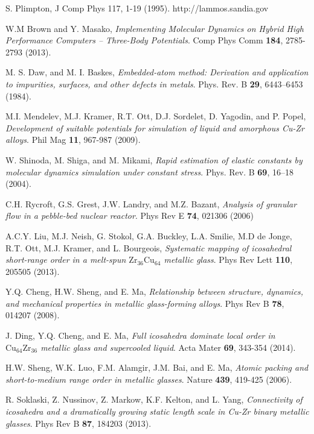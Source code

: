 \documentclass[aps,prl,preprint,showpacs,amsmath,floatfix,superscriptaddress]{revtex4}
\begin{document}
\begin{thebibliography}{}
S. Plimpton, J Comp Phys 117, 1-19 (1995). http://lammos.sandia.gov

W.M Brown and Y. Masako, \textit{Implementing Molecular Dynamics on Hybrid High Performance Computers – Three-Body Potentials}. Comp Phys Comm \textbf{184}, 2785-2793 (2013).

M. S. Daw, and M. I. Baskes, \textit{Embedded-atom method: Derivation and application to impurities, surfaces, and other defects in metals}. Phys. Rev. B \textbf{29}, 6443–6453 (1984).

M.I. Mendelev, M.J. Kramer, R.T. Ott, D.J. Sordelet, D. Yagodin, and P. Popel, \textit{Development of suitable potentials for simulation of liquid and amorphous Cu-Zr alloys}. Phil Mag \textbf{11}, 967-987 (2009).

W. Shinoda, M. Shiga, and M. Mikami, \textit{Rapid estimation of elastic constants by molecular dynamics simulation under constant stress}. Phys. Rev. B \textbf{69}, 16–18 (2004).

C.H. Rycroft, G.S. Grest, J.W. Landry, and M.Z. Bazant, \textit{Analysis of granular flow in a pebble-bed nuclear reactor}. Phys Rev E \textbf{74}, 021306 (2006)

A.C.Y. Liu, M.J. Neish, G. Stokol, G.A. Buckley, L.A. Smilie, M.D de Jonge, R.T. Ott, M.J. Kramer, and L. Bourgeois, \textit{Systematic mapping of icosahedral short-range order in a melt-spun $\mathrm{Zr_{36}Cu_{64}}$ metallic glass}. Phys Rev Lett \textbf{110}, 205505 (2013).

Y.Q. Cheng, H.W. Sheng, and E. Ma, \textit{Relationship between structure, dynamics, and mechanical properties in metallic glass-forming alloys}. Phys Rev B \textbf{78}, 014207 (2008).

J. Ding, Y.Q. Cheng, and E. Ma, \textit{Full icosahedra dominate local order in $\mathrm{Cu_{64}Zr_{36}}$ metallic glass and supercooled liquid}. Acta Mater \textbf{69}, 343-354 (2014).

H.W. Sheng, W.K. Luo, F.M. Alamgir, J.M. Bai, and E. Ma, \textit{Atomic packing and short-to-medium range order in metallic glasses}. Nature \textbf{439}, 419-425 (2006).

R. Soklaski, Z. Nussinov, Z. Markow, K.F. Kelton, and L. Yang, \textit{Connectivity of icosahedra and a dramatically growing static length scale in Cu-Zr binary metallic glasses}. Phys Rev B \textbf{87}, 184203 (2013).


\end{thebibliography}
\end{document}
